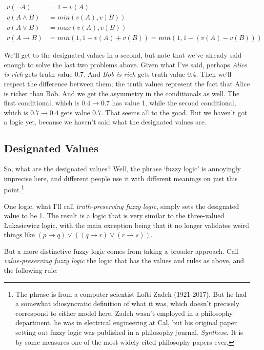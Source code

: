 \documentclass[
]{article}
\begin{document}
\begin{align*}
v(\neg A) &= 1 - v(A) \\
v(A \wedge B) &= min(v(A), v(B)) \\
v(A \vee B) &= max(v(A), v(B)) \\
v(A \rightarrow B) &= min(1, 1 - v(A) + v(B)) = min(1, 1 - (v(A) - v(B)))
\end{align*}

We'll get to the designated values in a second, but note that we've
already said enough to solve the last two problems above. Given what
I've said, perhaps \emph{Alice is rich} gets truth value 0.7. And
\emph{Bob is rich} gets truth value 0.4. Then we'll respect the
difference between them; the truth values represent the fact that Alice
is richer than Bob. And we get the asymmetry in the conditionals as
well. The first conditional, which is \(0.4 \rightarrow 0.7\) has value
1, while the second conditional, which is \(0.7 \rightarrow 0.4\) gets
value 0.7. That seems all to the good. But we haven't got a logic yet,
because we haven't said what the designated values are.

\hypertarget{designated-values}{%
\subsection{Designated Values}\label{designated-values}}

So, what are the designated values? Well, the phrase `fuzzy logic' is
annoyingly imprecise here, and different people use it with different
meanings on just this point.\footnote{The phrase is from a computer
  scientist Lofti Zadeh (1921-2017). But he had a somewhat idiosyncratic
  definition of what it was, which doesn't precisely correspond to
  either model here. Zadeh wasn't employed in a philosophy department,
  he was in electrical engineering at Cal, but his original paper
  setting out fuzzy logic was published in a philosophy journal,
  \emph{Synthese}. It is by some measures one of the most widely cited
  philosophy papers ever.}

One logic, what I'll call \emph{truth-preserving fuzzy logic}, simply
sets the designated value to be 1. The result is a logic that is very
similar to the three-valued Łukasiewicz logic, with the main exception
being that it no longer validates weird things like
\((p \rightarrow q) \vee ((q \rightarrow r) \vee (r \rightarrow s))\).

But a more distinctive fuzzy logic comes from taking a broader approach.
Call \emph{value-preserving fuzzy logic} the logic that has the values
and rules as above, and the following rule:
\end{document}
